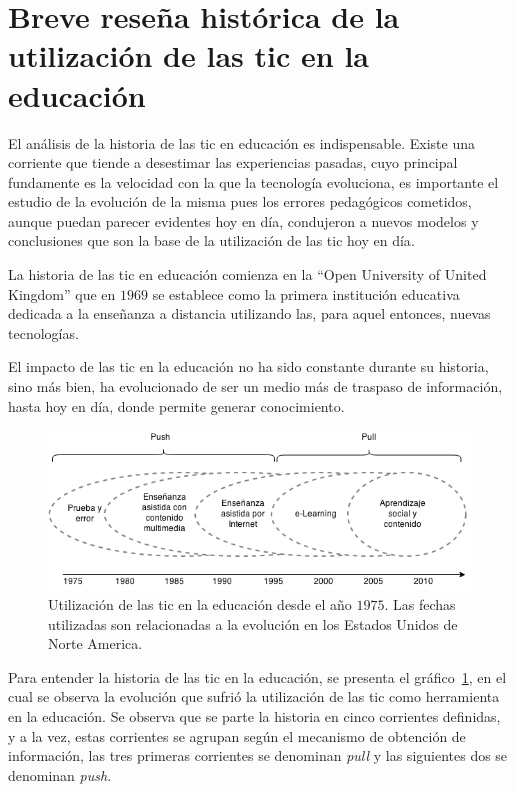 \section[Breve reseña histórica]{Breve reseña histórica de la utilización de las
    \gls{tic} en la educación}

El análisis de la historia de las \Gls{tic} en educación es
indispensable\cite{mcdougall2006theory}. Existe una corriente que tiende a
desestimar las experiencias pasadas, cuyo principal fundamente es la velocidad
con la que la tecnología evoluciona, es importante el estudio de la evolución de
la misma pues los errores pedagógicos cometidos, aunque puedan parecer evidentes
hoy en día, condujeron a nuevos modelos y conclusiones que son la base de la
utilización de las \Gls{tic} hoy en día\cite{mcdougall2006theory}.

La historia de las \Gls{tic} en educación comienza en la \enquote{Open
    University of United Kingdom} que en $1969$ se establece como la primera
institución educativa dedicada a la enseñanza a distancia utilizando las, para
aquel entonces, nuevas tecnologías\cite{tinio:ict}.

El impacto de las \Gls{tic} en la educación no ha sido constante durante su
historia, sino más bien, ha evolucionado de ser un medio más de traspaso de
información, hasta hoy en día, donde permite generar
conocimiento\cite{tinio:ict}.

\begin{figure}
\centering
\includegraphics[scale=0.75]{tics/images/tics_history.png}
\caption{Utilización de las \Gls{tic} en la educación desde el año $1975$. Las
    fechas utilizadas son relacionadas a la evolución en los Estados Unidos de
    Norte America.}
\label{fig:history_tics}
\end{figure}

Para entender la historia de las \Gls{tic} en la educación, se presenta el
gráfico~\ref{fig:history_tics}, en el cual se observa la evolución que sufrió la
utilización de las \Gls{tic} como herramienta en la educación. Se observa que se
parte la historia en cinco corrientes definidas, y a la vez, estas corrientes se
agrupan según el mecanismo de obtención de información, las tres primeras
corrientes se denominan \textit{pull} y las siguientes dos se denominan
\textit{push}. 


